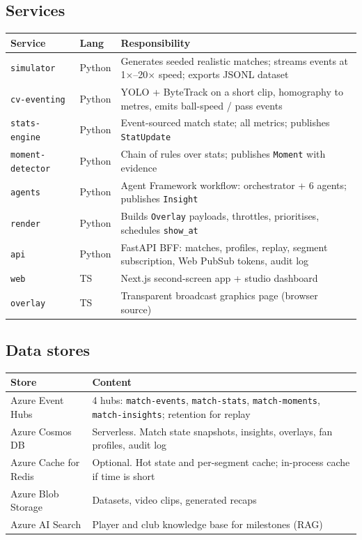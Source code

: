 \documentclass[11pt,a4paper]{article}
\begin{document}
\subsection{Services}
\begin{tabularx}{\linewidth}{@{}l l Y@{}}
\toprule
Service & Lang & Responsibility \\
\midrule
\texttt{simulator}       & Python & Generates seeded realistic matches; streams events at 1$\times$--20$\times$ speed; exports JSONL dataset \\
\texttt{cv-eventing}     & Python & YOLO + ByteTrack on a short clip, homography to metres, emits ball-speed / pass events \\
\texttt{stats-engine}    & Python & Event-sourced match state; all metrics; publishes \texttt{StatUpdate} \\
\texttt{moment-detector} & Python & Chain of rules over stats; publishes \texttt{Moment} with evidence \\
\texttt{agents}          & Python & Agent Framework workflow: orchestrator + 6 agents; publishes \texttt{Insight} \\
\texttt{render}          & Python & Builds \texttt{Overlay} payloads, throttles, prioritises, schedules \texttt{show\_at} \\
\texttt{api}             & Python & FastAPI BFF: matches, profiles, replay, segment subscription, Web PubSub tokens, audit log \\
\texttt{web}             & TS     & Next.js second-screen app + studio dashboard \\
\texttt{overlay}         & TS     & Transparent broadcast graphics page (browser source) \\
\bottomrule
\end{tabularx}

\subsection{Data stores}
\begin{tabularx}{\linewidth}{@{}l Y@{}}
\toprule
Store & Content \\
\midrule
Azure Event Hubs      & 4 hubs: \texttt{match-events}, \texttt{match-stats}, \texttt{match-moments}, \texttt{match-insights}; retention for replay \\
Azure Cosmos DB       & Serverless. Match state snapshots, insights, overlays, fan profiles, audit log \\
Azure Cache for Redis & Optional. Hot state and per-segment cache; in-process cache if time is short \\
Azure Blob Storage    & Datasets, video clips, generated recaps \\
Azure AI Search       & Player and club knowledge base for milestones (RAG) \\
\bottomrule
\end{tabularx}
\end{document}

